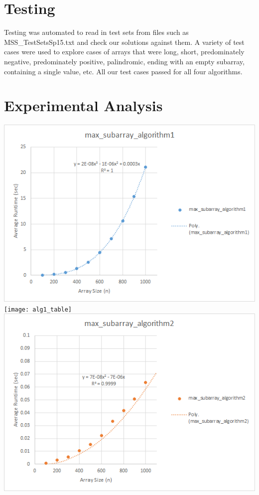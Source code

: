 \documentclass[paper=a4, fontsize=11pt]{scrartcl} %
\numberwithin{equation}{section} %
\numberwithin{figure}{section} %
\numberwithin{table}{section} %
\begin{document}
\section{Testing}
Testing was automated to read in test sets from files such as 
MSS\_TestSetsSp15.txt and check our solutions against them. A variety of test 
cases were used to explore cases of arrays that were long, short, 
predominately negative, predominately positive, palindromic, ending with 
an empty subarray, containing a single value, etc. All our test cases
passed for all four algorithms.

\section{Experimental Analysis}
\includegraphics[width=\textwidth]{algo1Plot}
\texttt{[image: alg1\_table]}
\includegraphics[width=\textwidth]{algo2Plot}
\end{document}
